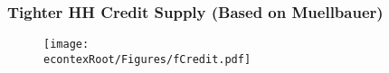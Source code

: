   \begin{frame}
    \frametitle{\textbf{Tighter  HH Credit Supply (Based on Muellbauer)}}

    \begin{figure}
      \texttt{[image: \\econtexRoot/Figures/fCredit.pdf]}
    \end{figure}
  \end{frame}
